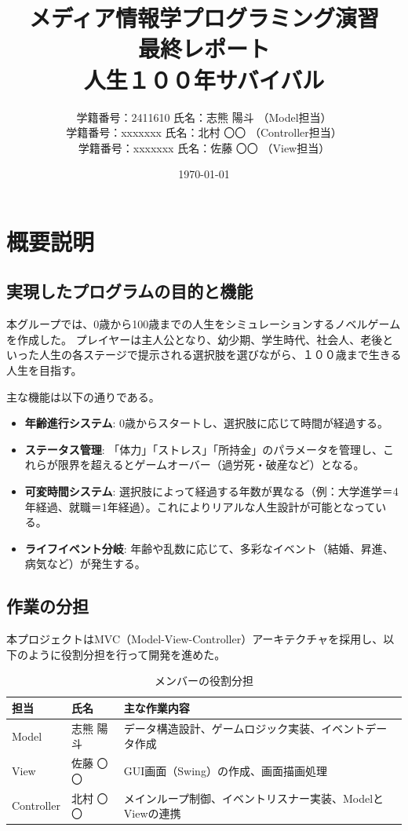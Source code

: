 \documentclass[a4paper,11pt]{jsarticle}
\title{メディア情報学プログラミング演習\\最終レポート\\人生１００年サバイバル}
\author{
  学籍番号：2411610 氏名：志熊 陽斗 （Model担当）\\
  学籍番号：xxxxxxx 氏名：北村 〇〇 （Controller担当）\\
  学籍番号：xxxxxxx 氏名：佐藤 〇〇 （View担当）
}
\date{\today}
\begin{document}
\maketitle

\newpage

\section{概要説明}
\subsection{実現したプログラムの目的と機能}
本グループでは、0歳から100歳までの人生をシミュレーションするノベルゲームを作成した。
プレイヤーは主人公となり、幼少期、学生時代、社会人、老後といった人生の各ステージで提示される選択肢を選びながら、１００歳まで生きる人生を目指す。

主な機能は以下の通りである。
\begin{itemize}
    \item \textbf{年齢進行システム}: 0歳からスタートし、選択肢に応じて時間が経過する。
    \item \textbf{ステータス管理}: 「体力」「ストレス」「所持金」のパラメータを管理し、これらが限界を超えるとゲームオーバー（過労死・破産など）となる。
    \item \textbf{可変時間システム}: 選択肢によって経過する年数が異なる（例：大学進学＝4年経過、就職＝1年経過）。これによりリアルな人生設計が可能となっている。
    \item \textbf{ライフイベント分岐}: 年齢や乱数に応じて、多彩なイベント（結婚、昇進、病気など）が発生する。
\end{itemize}

\subsection{作業の分担}
本プロジェクトはMVC（Model-View-Controller）アーキテクチャを採用し、以下のように役割分担を行って開発を進めた。

\begin{table}[h]
\centering
\caption{メンバーの役割分担}
\begin{tabular}{|l|l|l|}
\hline
担当 & 氏名 & 主な作業内容 \\ \hline
Model & 志熊 陽斗 & データ構造設計、ゲームロジック実装、イベントデータ作成 \\ \hline
View & 佐藤 〇〇 & GUI画面（Swing）の作成、画面描画処理 \\ \hline
Controller & 北村 〇〇 & メインループ制御、イベントリスナー実装、ModelとViewの連携 \\ \hline
\end{tabular}
\end{table}
\end{document}
